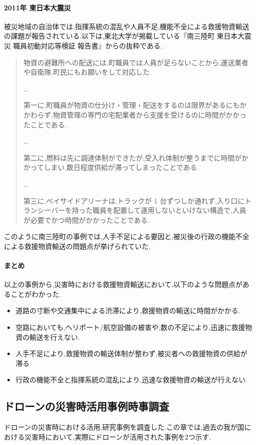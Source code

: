 \documentclass{article}[jsarticle]
\begin{document}
\paragraph{2011年 東日本大震災}
被災地域の自治体では,指揮系統の混乱や人員不足,機能不全による救援物資輸送の課題が報告されている.以下は,東北大学が掲載している『南三陸町 東日本大震災 職員初動対応等検証 報告書\cite{doc04}』からの抜粋である.
\begin{quote}
    物資の避難所への配送には,町職員では人員が足らないことから,運送業者や自衛隊,町民にもお願いをして対応した.\par 
    \ldots \par
    第一に,町職員が物資の仕分け・管理・配送をするのは限界があるにもかかわらず,物資管理の専門の宅配業者から支援を受けるのに時間がかかったことである.\par 
    \ldots \par
    第二に,燃料は先に調達体制ができたが,受入れ体制が整うまでに時間がかかってしまい,数日程度供給が滞ってしまったことである.\par
    \ldots \par
    第三に,ベイサイドアリーナは,トラックが 1 台ずつしか通れず,入り口にトランシーバーを持った職員を配置して運用しないといけない構造で,人員が必要でかつ時間がかかったことである.
\end{quote}
このように南三陸町の事例では,人手不足による要因と,被災後の行政の機能不全による救援物資輸送の問題点が挙げられていた.
\paragraph{まとめ}
以上の事例から,災害時における救援物資輸送において,以下のような問題点があることがわかった.
\begin{itemize}
    \item 道路の寸断や交通集中による渋滞により,救援物資の輸送に時間がかかる.
    \item 空路においても,ヘリポート/航空設備の被害や,数の不足により,迅速に救援物資の輸送を行えない.
    \item 人手不足により,救援物資の輸送体制が整わず,被災者への救援物資の供給が滞る.
    \item 行政の機能不全と指揮系統の混乱により,迅速な救援物資の輸送が行えない.
\end{itemize}

\subsection{ドローンの災害時活用事例時事調査}
ドローンの災害時における活用,研究事例を調査した.この章では,過去の我が国における災害時において,実際にドローンが活用された事例を2つ示す.
\end{document}
